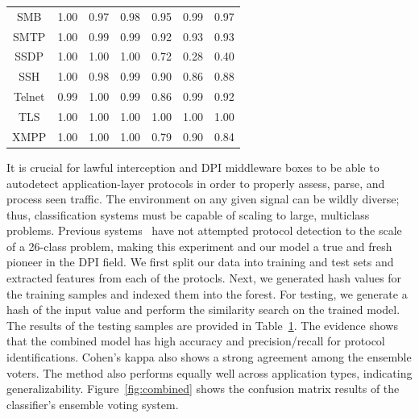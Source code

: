 \begin{table}
\begin{tabular}{| c | p{0.6cm}  p{0.6cm}  p{0.6cm} || p{0.6cm}  p{0.6cm}  p{0.6cm} |}
 SMB & 1.00 & 0.97 & 0.98 & 0.95 & 0.99 & 0.97 \\
 SMTP & 1.00 & 0.99 & 0.99 & 0.92 & 0.93 & 0.93 \\
 SSDP & 1.00 & 1.00 & 1.00 & 0.72 & 0.28 & 0.40 \\
 SSH & 1.00 & 0.98 & 0.99 & 0.90 & 0.86 & 0.88 \\
 Telnet & 0.99 & 1.00 & 0.99 & 0.86 & 0.99 & 0.92 \\
 TLS & 1.00 & 1.00 & 1.00 & 1.00 & 1.00 & 1.00 \\
 XMPP & 1.00 & 1.00 & 1.00 & 0.79 & 0.90 & 0.84 \\
 \hline
\end{tabular}
\label{table:results1}
\end{table}

It is crucial for lawful interception and DPI middleware boxes to be able to autodetect application-layer protocols in order to properly assess, parse, and process seen traffic. The environment on any given signal can be wildly diverse; thus, classification systems must be capable of scaling to large, multiclass problems. Previous systems~\cite{hslf, fpga} have not attempted protocol detection to the scale of a 26-class problem, making this experiment and our model a true and fresh pioneer in the DPI field. We first split our data into training and test sets and extracted features from each of the protocls. Next, we generated hash values for the training samples and indexed them into the forest. For testing, we generate a hash of the input value and perform the similarity search on the trained model. The results of the testing samples are provided in Table~\ref{table:results1}. The evidence shows that the combined model has high accuracy and precision/recall for protocol identifications. Cohen's kappa also shows a strong agreement among the ensemble voters. The method also performs equally well across application types, indicating generalizability. Figure~\ref{fig:combined} shows the confusion matrix results of the classifier's ensemble voting system.

